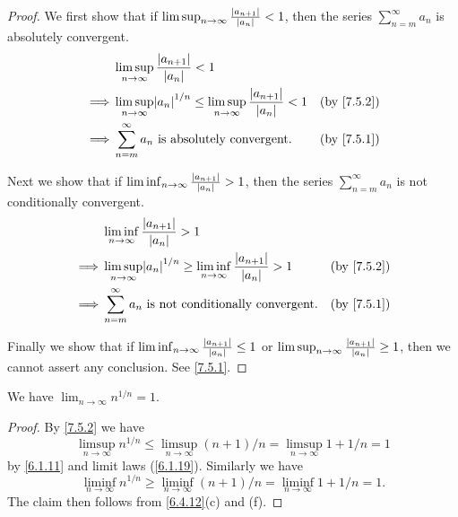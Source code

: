 \begin{proof}
  We first show that if \(\limsup_{n \to \infty} \frac{\left\lvert a_{n + 1}\right\rvert}{\left\lvert a_n\right\rvert} < 1\), then the series \(\sum_{n = m}^\infty a_n\) is absolutely convergent.
  \begin{align*}
             & \limsup_{n \to \infty} \frac{\abs{a_{n + 1}}}{\abs{a_n}} < 1                                                                          \\
    \implies & \limsup_{n \to \infty} \abs{a_n}^{1 / n} \leq \limsup_{n \to \infty} \frac{\abs{a_{n + 1}}}{\abs{a_n}} < 1 & \text{(by \cref{7.5.2})} \\
    \implies & \sum_{n = m}^\infty a_n \text{ is absolutely convergent}.                                                  & \text{(by \cref{7.5.1})}
  \end{align*}

  Next we show that if \(\liminf_{n \to \infty} \frac{\left\lvert a_{n + 1}\right\rvert}{\left\lvert a_n\right\rvert} > 1\), then the series \(\sum_{n = m}^\infty a_n\) is not conditionally convergent.
  \begin{align*}
             & \liminf_{n \to \infty} \frac{\abs{a_{n + 1}}}{\abs{a_n}} > 1                                                                          \\
    \implies & \limsup_{n \to \infty} \abs{a_n}^{1 / n} \geq \liminf_{n \to \infty} \frac{\abs{a_{n + 1}}}{\abs{a_n}} > 1 & \text{(by \cref{7.5.2})} \\
    \implies & \sum_{n = m}^\infty a_n \text{ is not conditionally convergent}.                                           & \text{(by \cref{7.5.1})}
  \end{align*}

  Finally we show that if \(\liminf_{n \to \infty} \frac{\left\lvert a_{n + 1}\right\rvert}{\left\lvert a_n\right\rvert} \leq 1\) or \(\limsup_{n \to \infty} \frac{\left\lvert a_{n + 1}\right\rvert}{\left\lvert a_n\right\rvert} \geq 1\), then we cannot assert any conclusion.
  See \cref{7.5.1}.
\end{proof}

\begin{prop}\label{7.5.4}
  We have \(\lim_{n \to \infty} n^{1 / n} = 1\).
\end{prop}

\begin{proof}
  By \cref{7.5.2} we have
  \[
    \limsup_{n \to \infty} n^{1 / n} \leq \limsup_{n \to \infty} (n + 1) / n = \limsup_{n \to \infty} 1 + 1 / n = 1
  \]
  by \cref{6.1.11} and limit laws (\cref{6.1.19}).
  Similarly we have
  \[
    \liminf_{n \to \infty} n^{1 / n} \geq \liminf_{n \to \infty} (n + 1) / n = \liminf_{n \to \infty} 1 + 1 / n = 1.
  \]
  The claim then follows from \cref{6.4.12}(c) and (f).
\end{proof}

